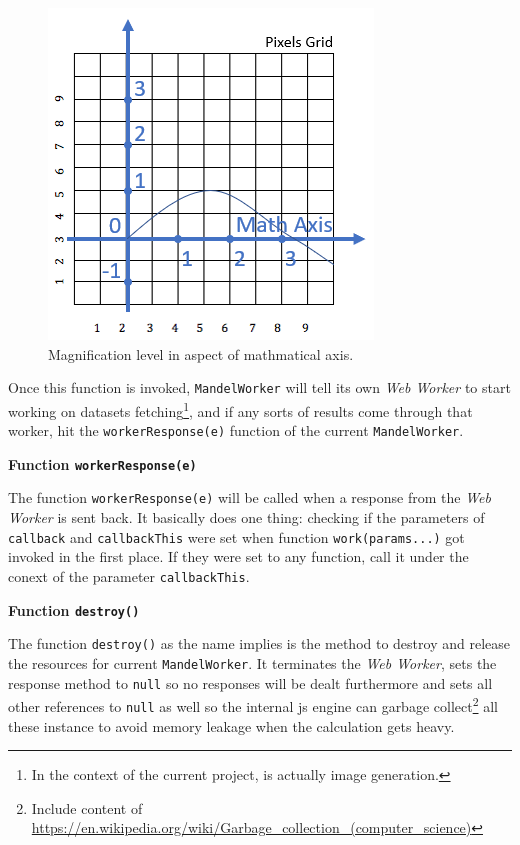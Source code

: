 \begin{figure}[th]
\centering
\includegraphics[keepaspectratio]{Figures/Chapter4/magnif.png}
\decoRule
\caption[Magnification Level]{Magnification level in aspect of mathmatical axis.}
\label{fig:magnif}
\end{figure}

Once this function is invoked, \texttt{MandelWorker} will tell its own \emph{Web Worker} to start working on datasets fetching\footnote{ In the context of the current project, is actually image generation. }, and if any sorts of results come through that worker, hit the \texttt{workerResponse(e)} function of the current \texttt{MandelWorker}.

\textbf{Function \texttt{workerResponse(e)}}

The function \texttt{workerResponse(e)} will be called when a response from the \emph{Web Worker} is sent back. It basically does one thing: checking if the parameters of \texttt{callback} and \texttt{callbackThis} were set when function \texttt{work(params...)} got invoked in the first place. If they were set to any function, call it under the conext of the parameter \texttt{callbackThis}.

\textbf{Function \texttt{destroy()}}

The function \texttt{destroy()} as the name implies is the method to destroy and release the resources for current \texttt{MandelWorker}. It terminates the \emph{Web Worker}, sets the response method to \texttt{null} so no responses will be dealt furthermore and sets all other references to \texttt{null} as well so the internal \gls{js} engine can garbage collect\footnote{ Include content of \url{https://en.wikipedia.org/wiki/Garbage_collection_(computer_science)}} all these instance to avoid memory leakage when the calculation gets heavy.

